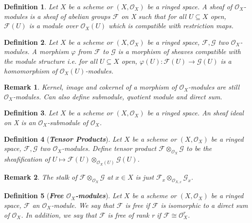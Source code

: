 \documentclass{ctexart}
\newtheorem{definition}{Definition}[section]
\newtheorem{remark}{Remark}[section]
\begin{document}
\begin{definition}
    Let $X$ be a scheme or $(X, \mathcal{O}_{X})$ be a ringed space.
    A sheaf of $\mathcal{O}_{X}$-modules is a sheaf of abelian groups $\mathcal{F}$ on X such that for all $U \subseteq X$ open, 
    $\mathcal{F}(U)$ is a module over $\mathcal{O}_{X}(U)$ which is compatible with restriction maps.
\end{definition}
\begin{definition}
    Let $X$ be a scheme or $(X, \mathcal{O}_{X})$ be a ringed space, $\mathcal{F},\mathcal{G}$ two $\mathcal{O}_{X}$-modules.
    A morphism $\varphi$ from $\mathcal{F}$ to $\mathcal{G}$ is a morphism of sheaves compatible with the module structure i.e. for all $U \subseteq X$ open, 
    $\varphi(U): \mathcal{F}(U) \longrightarrow \mathcal{G}(U)$ is a homomorphism of $\mathcal{O}_{X}(U)$-modules.
\end{definition}
\begin{remark}
    Kernel, image and cokernel of a morphism of $\mathcal{O}_{X}$-modules are still $\mathcal{O}_{X}$-modules.
    Can also define submodule, quotient module and direct sum.
\end{remark}
\begin{definition}
    Let $X$ be a scheme or $(X, \mathcal{O}_{X})$ be a ringed space.
    An sheaf ideal on X is an $\mathcal{O}_{X}$-submodule of $\mathcal{O}_{X}$.
\end{definition}
\begin{definition}[\textbf{\emph{Tensor Products}}]
    Let $X$ be a scheme or $(X, \mathcal{O}_{X})$ be a ringed space, $\mathcal{F},\mathcal{G}$ two $\mathcal{O}_{X}$-modules.
    Define tensor product $\mathcal{F} \otimes_{\mathcal{O}_{X}} \mathcal{G}$ to be the sheafification of $U \longmapsto \mathcal{F}(U) \otimes_{\mathcal{O}_{X}(U)} \mathcal{G}(U)$.
\end{definition}
\begin{remark}
    The stalk of $\mathcal{F} \otimes_{\mathcal{O}_{X}} \mathcal{G}$ at $x\in X$ is just $\mathcal{F}_{x} \otimes_{\mathcal{O}_{X, x}} \mathcal{G}_{x}$.
\end{remark}
\begin{definition}[\textbf{\emph{Free $\mathcal{O}_{X}$-modules}}]
    Let $X$ be a scheme or $(X, \mathcal{O}_{X})$ be a ringed space, $\mathcal{F}$ an $\mathcal{O}_{X}$-module.
    We say that $\mathcal{F}$ is free if $\mathcal{F}$ is isomorphic to a direct sum of $\mathcal{O}_{X}$.
    In addition, we say that $\mathcal{F}$ is free of rank r if $\mathcal{F} \cong \mathcal{O}_{X}^{r}$.
\end{definition}
\end{document}
